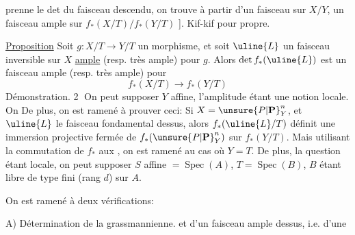 prenne le det du faisceau descendu, on trouve à partir d'un faisceau  sur $X/Y$, un faisceau ample sur $f_*(X/T)/f_*(Y/T)$ ]. Kif-kif pour propre.

\uline{Proposition} Soit $g:X/T\longrightarrow Y/T$ un morphisme, et soit $\uline{L}$ un faisceau inversible sur $X$ \uline{ample}  (resp. très ample) pour $g$. Alors $\det f_*(\uline{L})$ est un faisceau ample (resp. très ample) pour
\[
f_*(X/T)\longrightarrow f_*(Y/T)
\]
Démonstration. \textcircled{2} On peut supposer $Y$ affine, l'amplitude  étant une notion locale.  On    De plus, on est ramené à prouver ceci: Si $X=\unsure{P|\mathbf P}_Y^n$, et $\uline{L}$ le faisceau fondamental dessus, alors $f_*(\uline{L}/T)$  définit une immersion projective fermée de $f_*(\unsure{P|\mathbf P}_Y^n)$ sur  $f_*(Y/T)$. Mais utilisant la commutation de $f_*$ aux , on est ramené au cas où $Y=T$. De plus, la question étant locale, on peut supposer $S$ affine $=\operatorname{Spec}(A)$, $T=\operatorname{Spec}(B)$, $B$ étant libre de type fini (rang $d$) sur $A$.

On est ramené  à deux vérifications:

A) Détermination de la grassmannienne.
et d'un faisceau ample dessus, i.e. d'une 
